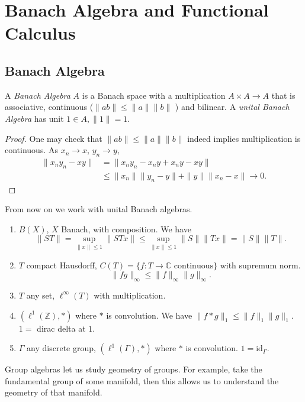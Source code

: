 \section{Banach Algebra and Functional Calculus}


\subsection{Banach Algebra}


\begin{definition}
	\label{defn:BanachAlgebra}
	A \textit{Banach Algebra} $A$ is a Banach space with a multiplication $A \times A \to A$ that is associative, continuous ($\|a b\|\le \|a\|\|b\|$ ) and bilinear. A \textit{unital Banach Algebra} has unit $1 \in A, \|1\| = 1$.
\end{definition}
\begin{proof}
One may check that $\|a b\| \le \|a\|\|b\|$ indeed implies multiplication is continuous. As $x_n \to x$, $y_n \to y$,
\begin{align*}
	\|x_n y_n - x y\| &= \|x_n y_n - x_n y + x_n y - x y\|\\
	&\leq \|x_n\| \|y_n - y\| + \|y\| \|x_n - x\| \to 0
.\end{align*}
\end{proof}

From now on we work with unital Banach algebras.

\begin{example}
	\begin{enumerate}
		\item $B(X)$, $X$ Banach, with composition. We have
			\[
				\|S T\| = \sup _{\|x\|\le 1} \|ST x\| \le \sup _{\|x\|\le 1} \|S\| \|T x\| = \|S\| \|T\|
			.\] 
		\item $T$ compact Hausdorff, $C(T) = \{f: T \to \mathbb{C} \text{ continuous}\} $ with supremum norm.
			\[
				\|f g\|_\infty  \le  \|f\|_\infty \|g\|_\infty 
			.\] 
		\item $T$ any set, $\ell^\infty (T)$ with multiplication.
		\item $(\ell^1(\mathbb{Z}), *)$ where $*$ is convolution. We have $\|f * g\|_1 \le  \|f\|_1 \|g\|_1$. $1 = $ dirac delta at $1$. 
		\item $\Gamma$ any discrete group, $(\ell^1(\Gamma),*)$ where $*$ is convolution. $1 = \text{id}_\Gamma$.
	\end{enumerate}
\end{example}

\begin{remark}
	Group algebras let us study geometry of groups. For example, take the fundamental group of some manifold, then this allows us to understand the geometry of that manifold.
\end{remark}

